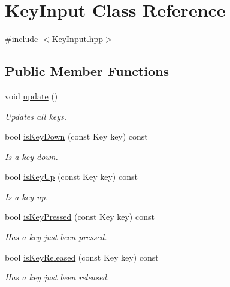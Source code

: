\hypertarget{class_key_input}{}\section{Key\+Input Class Reference}
\label{class_key_input}


{\ttfamily \#include $<$Key\+Input.\+hpp$>$}

\subsection*{Public Member Functions}
\begin{DoxyCompactItemize}
\item 
\hypertarget{class_key_input_ab32b8ec028e37e27e059c0ba5109d9f0}{}void \hyperlink{class_key_input_ab32b8ec028e37e27e059c0ba5109d9f0}{update} ()\label{class_key_input_ab32b8ec028e37e27e059c0ba5109d9f0}

\begin{DoxyCompactList}\small\item\em Updates all keys. \end{DoxyCompactList}\item 
\hypertarget{class_key_input_a14646d6a26aac7f82877b6f14a860810}{}bool \hyperlink{class_key_input_a14646d6a26aac7f82877b6f14a860810}{is\+Key\+Down} (const Key key) const \label{class_key_input_a14646d6a26aac7f82877b6f14a860810}

\begin{DoxyCompactList}\small\item\em Is a key down. \end{DoxyCompactList}\item 
\hypertarget{class_key_input_a05667656783ac709b9b2aaf22f2eab93}{}bool \hyperlink{class_key_input_a05667656783ac709b9b2aaf22f2eab93}{is\+Key\+Up} (const Key key) const \label{class_key_input_a05667656783ac709b9b2aaf22f2eab93}

\begin{DoxyCompactList}\small\item\em Is a key up. \end{DoxyCompactList}\item 
\hypertarget{class_key_input_aedc341260ca4a091ae068c9511fc2060}{}bool \hyperlink{class_key_input_aedc341260ca4a091ae068c9511fc2060}{is\+Key\+Pressed} (const Key key) const \label{class_key_input_aedc341260ca4a091ae068c9511fc2060}

\begin{DoxyCompactList}\small\item\em Has a key just been pressed. \end{DoxyCompactList}\item 
\hypertarget{class_key_input_abc5ff40ae7764fc2aa9694a5d5b46fb6}{}bool \hyperlink{class_key_input_abc5ff40ae7764fc2aa9694a5d5b46fb6}{is\+Key\+Released} (const Key key) const \label{class_key_input_abc5ff40ae7764fc2aa9694a5d5b46fb6}

\begin{DoxyCompactList}\small\item\em Has a key just been released. \end{DoxyCompactList}\end{DoxyCompactItemize}


